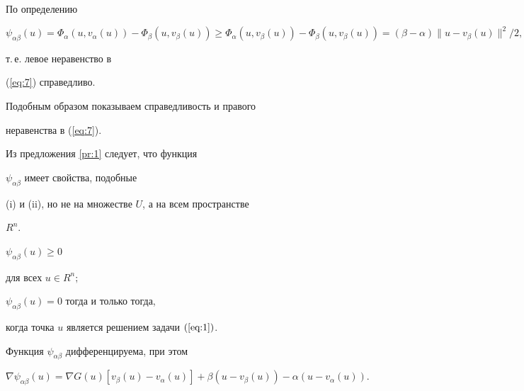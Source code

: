 \begin{pf} По определению


$$


\psi_{\alpha \beta }(u) =


\Phi_{\alpha }(u, v_{\alpha }(u)) -


\Phi_{\beta }(u, v_{\beta }(u)) \geq


\Phi_{\alpha }(u, v_{\beta }(u))-


\Phi_{\beta }(u, v_{\beta }(u))=


(\beta -\alpha ) \| u - v_{\beta }(u)\|^{2} / 2,


$$


т.\,е. левое неравенство в


(\ref{eq:7}) справедливо. 


Подобным образом показываем справедливость и правого 


неравенства в (\ref{eq:7}).


\end{pf}





Из предложения \ref{pr:1} следует, что функция


$ \psi_{\alpha \beta }$ имеет свойства, подобные 


(i) и (ii), но не на множестве $U$, а на всем пространстве


$R^{n}$.





\begin{prop} \label{pr:2}


{} $ \psi_{\alpha \beta }(u) \geq 0$


для всех $u \in R^{n};$





{} $\psi_{\alpha \beta }(u) = 0$ тогда и только тогда,


когда точка $u$ является решением задачи $(\ref{eq:1})$.


\end{prop}





\begin{thm} \label{thm:1}


Функция $\psi_{\alpha \beta }$ дифференцируема, при этом 


\begin{equation} \label{eq:8}


\nabla \psi_{\alpha \beta }(u)


= \nabla G(u)


[ v_{\beta }(u) - v_{\alpha }(u)] +


{\beta }(u - v_{\beta }(u)) -


{\alpha }(u - v_{\alpha }(u)).


\end{equation}


\end{thm}





